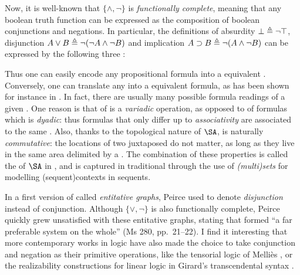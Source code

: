 \begin{scope}
\AP
Now, it is well-known that $\{\land,\neg\}$ is \emph{functionally complete},
meaning that any boolean truth function can be expressed as the composition of
boolean conjunctions and negations. In particular, the  definitions of
absurdity $\bot \triangleq \neg\top$,  disjunction $A \lor B \triangleq
\neg(\neg A \land \neg B)$ and  implication $A \supset B \triangleq \neg (A
\land \neg B)$ can be expressed by the following three :
Thus one can easily encode any propositional formula into a 
equivalent . Conversely, one can translate any  into a
 equivalent formula, as has been shown for instance in
. In fact, there are usually many
possible formula readings of a given . One reason is that
 of  is a \emph{variadic} operation, as opposed to
 of formulas which is \emph{dyadic}: thus formulas that only
differ up to \emph{associativity} are associated to the same . Also,
thanks to the topological nature of $\SA$,  is naturally
\emph{commutative}: the locations of two juxtaposed  do not matter,
as long as they live in the same area delimited by a . The combination
of these properties is called the  of $\SA$ in
, and is captured in traditional 
through the use of \emph{(multi)sets} for modelling \kl(sequent){contexts} in sequents.

\begin{remark}
  
  In a first version of  called \emph{entitative graphs}, Peirce used
   to denote \emph{disjunction} instead of conjunction.
  Although $\{\lor,\neg\}$ is also functionally complete, Peirce quickly grew
  unsatisfied with these entitative graphs, stating that  formed ``a far
  preferable system on the whole'' (Ms 280, pp.~21--22). I find it interesting
  that more contemporary works in logic have also made the choice to take
  conjunction and negation as their primitive operations, like the tensorial
  logic of Melliès \cite{mellies_micrological_2017}, or the realizability
  constructions for linear logic in Girard's transcendental syntax
  \cite{eng_stellar_2020}.
\end{remark}


\end{scope}
